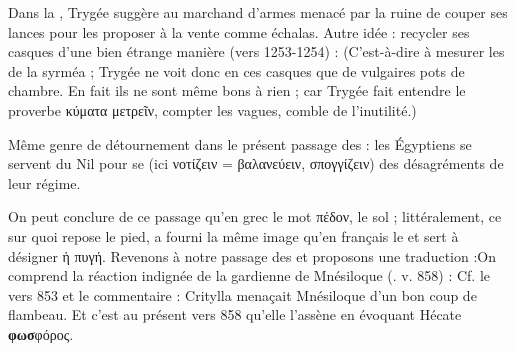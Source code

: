 {Dans la , Trygée suggère au marchand d'armes menacé par la ruine de couper ses lances pour les proposer à la vente comme échalas. Autre idée : recycler ses casques d'une bien étrange manière (vers 1253-1254) :
(C'est-à-dire à mesurer les  de la syrméa ; Trygée ne voit donc en ces casques que de vulgaires pots de chambre. En fait ils ne sont même bons à rien ; car Trygée fait entendre le proverbe κύματα μετρεῖν, compter les vagues, comble de l'inutilité.)

Même genre de détournement dans le présent passage des  : les Égyptiens se servent du Nil pour se  (ici νοτίζειν = βαλανεύειν, σπογγίζειν) des désagréments de leur régime.

On peut conclure de ce passage qu'en grec le mot πέδον, le sol ; littéralement, ce sur quoi repose le pied, a fourni la même image qu'en français le  et sert à désigner ἡ πυγή. 
Revenons à notre passage des  et proposons une traduction :On comprend la réaction indignée de la gardienne de Mnésiloque (. v. 858) :
Cf. le vers 853 et le commentaire  :
Critylla menaçait Mnésiloque d'un bon coup de flambeau. Et c'est au présent vers 858 qu'elle l'assène en évoquant Hécate \textbf{φωσ}φόρος.}
